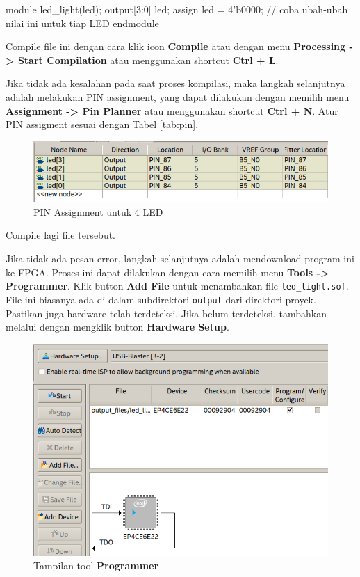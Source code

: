 \documentclass[a4paper,12pt,bahasa]{extarticle}
\begin{document}
{
\begin{verilogcode}
module led_light(led);
  output[3:0] led;
  assign led = 4'b0000; // coba ubah-ubah nilai ini untuk tiap LED
endmodule
\end{verilogcode}
}

Compile file ini dengan cara klik icon \textbf{Compile} atau dengan menu
\textbf{Processing -> Start Compilation} atau menggunakan shortcut
\textbf{Ctrl + L}.

Jika tidak ada kesalahan pada saat proses kompilasi,
maka langkah selanjutnya adalah melakukan
PIN assignment, yang dapat dilakukan dengan memilih menu
\textbf{Assignment -> Pin Planner} atau menggunakan shortcut
\textbf{Ctrl + N}. Atur PIN assigment sesuai dengan Tabel \ref{tab:pin}.

\begin{figure}[H]
\centering
\includegraphics[scale=0.5]{images/PinPlanner_4LED.png}
\par
\caption{PIN Assignment untuk 4 LED}
\end{figure}

Compile lagi file tersebut.

Jika tidak ada pesan error, langkah selanjutnya adalah mendownload program
ini ke FPGA. Proses ini dapat dilakukan dengan cara memilih menu
\textbf{Tools -> Programmer}.
Klik button \textbf{Add File} untuk menambahkan file {\tt led\_light.sof}.
File ini biasanya ada di dalam subdirektori {\tt output} dari direktori
proyek.
Pastikan juga hardware telah terdeteksi. Jika belum terdeteksi, tambahkan melalui
dengan mengklik button \textbf{Hardware Setup}.

\begin{figure}[H]
\centering
\includegraphics[scale=0.6]{images/Programmer_4LED.png}
\par
\caption{Tampilan tool \textbf{Programmer}}
\end{figure}
\end{document}
